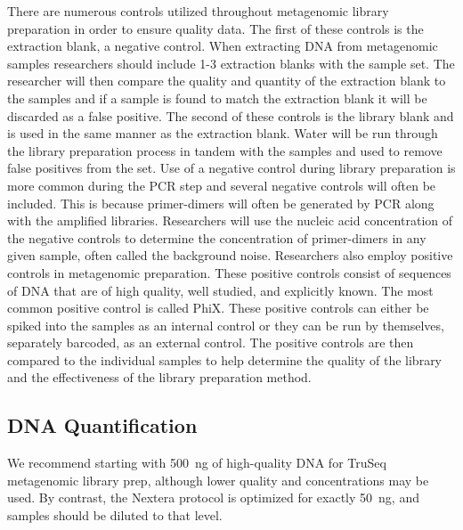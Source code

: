\documentclass[graybox]{svmult}
\begin{document}
There are numerous controls utilized throughout metagenomic library preparation in order to ensure quality data. The first of these controls is the extraction blank, a negative control. When extracting DNA from metagenomic samples researchers should include 1-3 extraction blanks with the sample set. The researcher will then compare the quality and quantity of the extraction blank to the samples and if a sample is found to match the extraction blank it will be discarded as a false positive.
%
The second of these controls is the library blank and is used in the same manner as the extraction blank. Water will be run through the library preparation process in tandem with the samples and used to remove false positives from the set.
%
Use of a negative control during library preparation is more common during the PCR step and several negative controls will often be included. This is because primer-dimers will often be generated by PCR along with the amplified libraries. Researchers will use the nucleic acid concentration of the negative controls to determine the concentration of primer-dimers in any given sample, often called the background noise.
%
Researchers also employ positive controls in metagenomic preparation. These positive controls consist of sequences of DNA that are of high quality, well studied, and explicitly known. The most common positive control is called PhiX. These positive controls can either be spiked into the samples as an internal control or they can be run by themselves, separately barcoded, as an external control. The positive controls are then compared to the individual samples to help determine the quality of the library and the effectiveness of the library preparation method. 

\subsection{DNA Quantification}

We recommend starting with 500~ng of high-quality DNA for TruSeq metagenomic library prep, although lower quality and concentrations may be used. By contrast, the Nextera protocol is optimized for exactly 50~ng, and samples should be diluted to that level.
\end{document}
